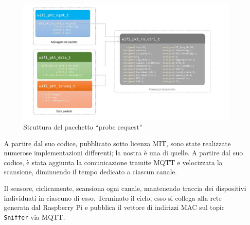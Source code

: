 \begin{figure}[H]
  \centering
  \includegraphics[width=\textwidth]{res/fig/sniffer.jpg}
  \caption{Struttura del pacchetto ``probe request''}%
  \label{fig:probe}
\end{figure}

A partire dal suo codice, pubblicato sotto licenza MIT, sono state realizzate numerose implementazioni differenti;
la nostra è una di quelle.
A partire dal suo codice, è stata aggiunta la comunicazione tramite MQTT e velocizzata la scansione, diminuendo il tempo dedicato a ciascun canale.

Il sensore, ciclicamente, scansiona ogni canale, mantenendo traccia dei dispositivi individuati in ciascuno di esso.
Terminato il ciclo, esso si collega alla rete generata dal Raspberry Pi e pubblica il vettore di indirizzi MAC sul topic \texttt{Sniffer} via MQTT\@.
